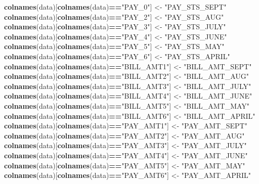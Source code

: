 \documentclass[]{article}
\newenvironment{Shaded}{\begin{snugshade}}{\end{snugshade}}
\newcommand{\KeywordTok}[1]{\textcolor[rgb]{0.13,0.29,0.53}{\textbf{#1}}}
\newcommand{\StringTok}[1]{\textcolor[rgb]{0.31,0.60,0.02}{#1}}
\newcommand{\OperatorTok}[1]{\textcolor[rgb]{0.81,0.36,0.00}{\textbf{#1}}}
\newcommand{\NormalTok}[1]{#1}
\begin{document}
\begin{Shaded}
\begin{Highlighting}[]
\KeywordTok{colnames}\NormalTok{(data)[}\KeywordTok{colnames}\NormalTok{(data)}\OperatorTok{==}\StringTok{"PAY_0"}\NormalTok{] <-}\StringTok{ "PAY_STS_SEPT"}
\KeywordTok{colnames}\NormalTok{(data)[}\KeywordTok{colnames}\NormalTok{(data)}\OperatorTok{==}\StringTok{"PAY_2"}\NormalTok{] <-}\StringTok{ "PAY_STS_AUG"}
\KeywordTok{colnames}\NormalTok{(data)[}\KeywordTok{colnames}\NormalTok{(data)}\OperatorTok{==}\StringTok{"PAY_3"}\NormalTok{] <-}\StringTok{ "PAY_STS_JULY"}
\KeywordTok{colnames}\NormalTok{(data)[}\KeywordTok{colnames}\NormalTok{(data)}\OperatorTok{==}\StringTok{"PAY_4"}\NormalTok{] <-}\StringTok{ "PAY_STS_JUNE"}
\KeywordTok{colnames}\NormalTok{(data)[}\KeywordTok{colnames}\NormalTok{(data)}\OperatorTok{==}\StringTok{"PAY_5"}\NormalTok{] <-}\StringTok{ "PAY_STS_MAY"}
\KeywordTok{colnames}\NormalTok{(data)[}\KeywordTok{colnames}\NormalTok{(data)}\OperatorTok{==}\StringTok{"PAY_6"}\NormalTok{] <-}\StringTok{ "PAY_STS_APRIL"}
\KeywordTok{colnames}\NormalTok{(data)[}\KeywordTok{colnames}\NormalTok{(data)}\OperatorTok{==}\StringTok{"BILL_AMT1"}\NormalTok{] <-}\StringTok{ "BILL_AMT_SEPT"}
\KeywordTok{colnames}\NormalTok{(data)[}\KeywordTok{colnames}\NormalTok{(data)}\OperatorTok{==}\StringTok{"BILL_AMT2"}\NormalTok{] <-}\StringTok{ "BILL_AMT_AUG"}
\KeywordTok{colnames}\NormalTok{(data)[}\KeywordTok{colnames}\NormalTok{(data)}\OperatorTok{==}\StringTok{"BILL_AMT3"}\NormalTok{] <-}\StringTok{ "BILL_AMT_JULY"}
\KeywordTok{colnames}\NormalTok{(data)[}\KeywordTok{colnames}\NormalTok{(data)}\OperatorTok{==}\StringTok{"BILL_AMT4"}\NormalTok{] <-}\StringTok{ "BILL_AMT_JUNE"}
\KeywordTok{colnames}\NormalTok{(data)[}\KeywordTok{colnames}\NormalTok{(data)}\OperatorTok{==}\StringTok{"BILL_AMT5"}\NormalTok{] <-}\StringTok{ "BILL_AMT_MAY"}
\KeywordTok{colnames}\NormalTok{(data)[}\KeywordTok{colnames}\NormalTok{(data)}\OperatorTok{==}\StringTok{"BILL_AMT6"}\NormalTok{] <-}\StringTok{ "BILL_AMT_APRIL"}
\KeywordTok{colnames}\NormalTok{(data)[}\KeywordTok{colnames}\NormalTok{(data)}\OperatorTok{==}\StringTok{"PAY_AMT1"}\NormalTok{] <-}\StringTok{ "PAY_AMT_SEPT"}
\KeywordTok{colnames}\NormalTok{(data)[}\KeywordTok{colnames}\NormalTok{(data)}\OperatorTok{==}\StringTok{"PAY_AMT2"}\NormalTok{] <-}\StringTok{ "PAY_AMT_AUG"}
\KeywordTok{colnames}\NormalTok{(data)[}\KeywordTok{colnames}\NormalTok{(data)}\OperatorTok{==}\StringTok{"PAY_AMT3"}\NormalTok{] <-}\StringTok{ "PAY_AMT_JULY"}
\KeywordTok{colnames}\NormalTok{(data)[}\KeywordTok{colnames}\NormalTok{(data)}\OperatorTok{==}\StringTok{"PAY_AMT4"}\NormalTok{] <-}\StringTok{ "PAY_AMT_JUNE"}
\KeywordTok{colnames}\NormalTok{(data)[}\KeywordTok{colnames}\NormalTok{(data)}\OperatorTok{==}\StringTok{"PAY_AMT5"}\NormalTok{] <-}\StringTok{ "PAY_AMT_MAY"}
\KeywordTok{colnames}\NormalTok{(data)[}\KeywordTok{colnames}\NormalTok{(data)}\OperatorTok{==}\StringTok{"PAY_AMT6"}\NormalTok{] <-}\StringTok{ "PAY_AMT_APRIL"}
\end{Highlighting}
\end{Shaded}
\end{document}
